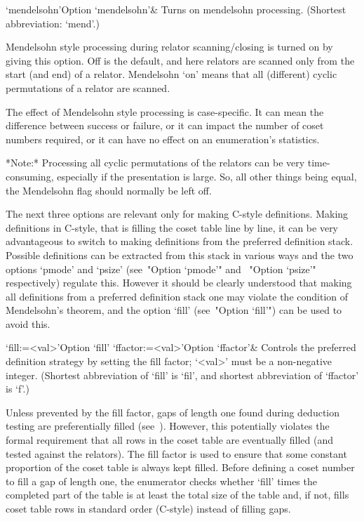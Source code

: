 \>`mendelsohn'{Option `mendelsohn'}&
Turns on mendelsohn processing. (Shortest abbreviation: `mend'.)

Mendelsohn style processing during relator scanning/closing is  turned
on by giving this option. Off is the default, and  here  relators  are
scanned only from  the  start  (and  end)  of  a  relator.  Mendelsohn
\lq{}on' means that all (different) cyclic permutations of  a  relator
are scanned.

The effect of Mendelsohn style processing  is  case-specific.  It  can
mean the difference between success or failure, or it can  impact  the
number of coset numbers required, or it  can  have  no  effect  on  an
enumeration's statistics.

*Note:* Processing all cyclic permutations of the relators can be very
time-consuming,  especially if  the  presentation is  large.  So,  all
other things being equal, the  Mendelsohn flag should normally be left
off.


The  next  three  options  are  relevant  only  for   making   C-style
definitions. Making definitions in C-style, that is filling the  coset
table line by line, it can be very advantageous to  switch  to  making
definitions from the preferred definition stack. Possible  definitions
can be extracted from this stack in various ways and the  two  options
`pmode'  and  `psize'  (see~"Option  `pmode'"  and  ~"Option  `psize'"
respectively) regulate this. However it should be  clearly  understood
that making all definitions from a preferred definition stack one  may
violate the condition of Mendelsohn's theorem, and the  option  `fill'
(see~"Option `fill'") can be used to avoid this.

\>`fill:=<val>'{Option `fill'}
\>`ffactor:=<val>'{Option `ffactor'}&
Controls the preferred definition strategy by setting the fill factor;
`<val>' must be a non-negative integer.
(Shortest abbreviation of `fill' is `fil', and  shortest  abbreviation
of `ffactor' is `f'.)

Unless prevented by  the fill factor, gaps of  length one found during
deduction   testing  are  preferentially   filled  (see~\cite{Hav91}).
However,  this potentially  violates the  formal requirement  that all
rows in the coset table  are eventually filled (and tested against the
relators).   The fill  factor is  used  to ensure  that some  constant
proportion of the coset table  is always kept filled.  Before defining
a coset  number to  fill a  gap of length  one, the  enumerator checks
whether `fill' times  the completed part of the table  is at least the
total  size of  the  table and,  if  not, fills  coset  table rows  in
standard order (C-style) instead of filling gaps.


